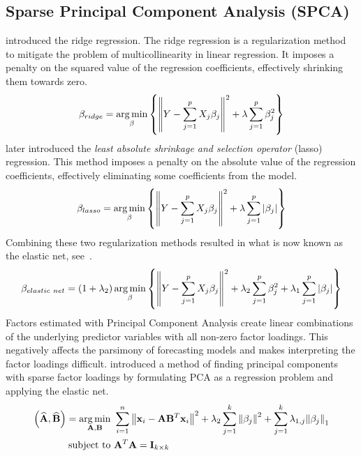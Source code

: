 \subsection{Sparse Principal Component Analysis (SPCA)}
\label{sec:spca}
\textcite{Tikhonov978} introduced the ridge regression.
The ridge regression is a regularization method to mitigate the problem of multicollinearity in linear regression.
It imposes a penalty on the squared value of the regression coefficients, effectively shrinking them towards zero.
\begin{equation}
	\beta_{ridge} = \operatorname*{\arg\min}_{\beta} \left\{ { \left\lVert Y - \sum_{j=1}^p X_j \beta_j \right\rVert }^2 + \lambda \sum_{j=1}^p \beta_j^2 \right\} 
\end{equation}
\textcite{Tibshirani1996} later introduced the \textit{least absolute shrinkage and selection operator} (lasso) regression. 
This method imposes a penalty on the absolute value of the regression coefficients, effectively eliminating some coefficients from the model.
\begin{equation}
	\beta_{lasso} = \operatorname*{\arg\min}_{\beta} \left\{ { \left\lVert Y - \sum_{j=1}^p X_j \beta_j \right\rVert }^2 + \lambda \sum_{j=1}^p |\beta_j| \right\} 
\end{equation}
Combining these two regularization methods resulted in what is now known as the elastic net, see~\textcite{Zou2005}.
\begin{equation}
	\beta_{elastic\ net} = (1 + \lambda_2) \operatorname*{\arg\min}_{\beta} \left\{ { \left\lVert Y - \sum_{j=1}^p X_j \beta_j \right\rVert }^2 + \lambda_2 \sum_{j=1}^p \beta_j^2 + \lambda_1 \sum_{j=1}^p |\beta_j|  \right\} 
\end{equation}
Factors estimated with Principal Component Analysis create linear combinations of the underlying predictor variables with all non-zero factor loadings. 
This negatively affects the parsimony of forecasting models and makes interpreting the factor loadings difficult. 
\textcite{Zou2006} introduced a method of finding principal components with sparse factor loadings by formulating PCA as a regression problem and applying the elastic net. 
\begin{equation}
\begin{aligned}
	\left(\mathbf{\widehat{A}},\mathbf{\widehat{B}}\right) = \operatorname*{\arg\min}_{\mathbf{A},\mathbf{B}}\ &\sum_{i=1}^n { \left\lVert \mathbf{x}_i - \mathbf{A}\mathbf{B}^T\mathbf{x}_i \right\rVert }^2 + \lambda_2 \sum_{j=1}^k {\lVert \beta_j \rVert}^2 + \sum_{j=1}^k \lambda_{1,j} {\lVert \beta_j \rVert}_1 \\
	\text{subject to}\ &\mathbf{A}^T\mathbf{A} = \mathbf{I}_{k \times k}
\end{aligned}
\end{equation}

